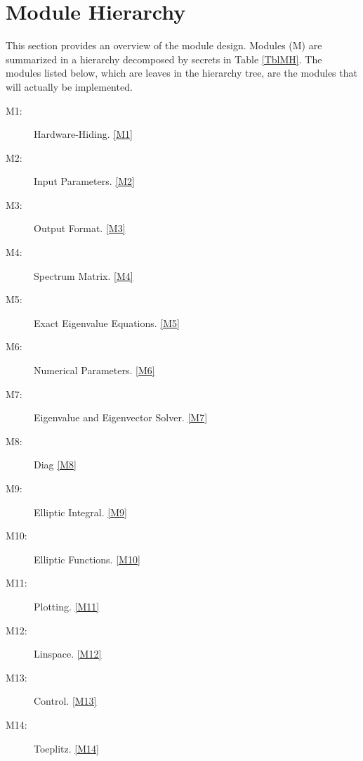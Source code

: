 \documentclass[12pt, titlepage]{article}
\begin{document}
	\section{Module Hierarchy} \label{SecMH}
	
	This section provides an overview of the module design. Modules (M) are 
	summarized
	in a hierarchy decomposed by secrets in Table \ref{TblMH}. The modules 
	listed
	below, which are leaves in the hierarchy tree, are the modules that will
	actually be implemented.
	\begin{description}
		\item[M1:] Hardware-Hiding. \ref{M1} \\
		\item[M2:] Input Parameters. \ref{M2} \\
		\item[M3:] Output Format. \ref{M3} \\
		\item[M4:] Spectrum Matrix. \ref{M4} \\
		\item[M5:] Exact Eigenvalue Equations. \ref{M5} \\
		\item[M6:] Numerical Parameters. \ref{M6} \\
		\item[M7:] Eigenvalue and Eigenvector Solver. \ref{M7} \\
		\item[M8:] Diag \ref{M8} \\
		\item[M9:] Elliptic Integral.  \ref{M9} \\
		\item[M10:] Elliptic Functions.  \ref{M10} \\
		\item[M11:] Plotting.  \ref{M11} \\
		\item[M12:] Linspace.  \ref{M12} \\
		\item[M13:] Control.  \ref{M13} \\ 
		\item[M14:] Toeplitz. \ref{M14}
	\end{description}
	
\end{document}
